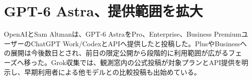 \section{GPT-6 Astra、提供範囲を拡大}

OpenAIとSam Altmanは、GPT-6 AstraをPro、Enterprise、Business PremiumユーザーのChatGPT Work/CodexとAPIへ提供したと投稿した。PlusやBusinessへの展開は今後数日とされ、前日の限定公開から段階的に利用範囲が広がるフェーズへ移った。Grok収集では、観測窓内の公式投稿が対象プランとAPI提供を明示し、早期利用者による他モデルとの比較投稿も出始めている。

